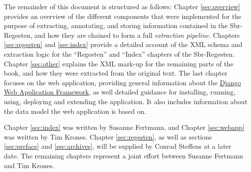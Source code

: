 The remainder of this document is structured as follows: Chapter
\ref{sec:overview} provides an overview of the different components
that were implemented for the purpose of extracting, annotating, and
storing information contained in the Sbr-Regesten, and how they are
chained to form a full \emph{extraction pipeline}. Chapters
\ref{sec:regesten} and \ref{sec:index} provide a detailed account of
the XML schema and extraction logic for the ``Regesten'' and ``Index''
chapters of the Sbr-Regesten. Chapter \ref{sec:other} explains the XML
mark-up for the remaining parts of the book, and how they were
extracted from the original text. The last chapter focuses on the web
application, providing general information about the
\href{https://www.djangoproject.com/}{Django Web Application
  Framework}, as well detailed guidance for installing, running,
using, deploying and extending the application. It also includes
information about the data model the web application is based on.

Chapter \ref{sec:index} was written by Susanne Fertmann, and Chapter
\ref{sec:webapp} was written by Tim Krones. Chapter
\ref{sec:regesten}, as well as sections \ref{sec:preface} and
\ref{sec:archives}, will be supplied by Conrad Steffens at a later
date. The remaining chapters represent a joint effort between Susanne
Fertmann and Tim Krones.

